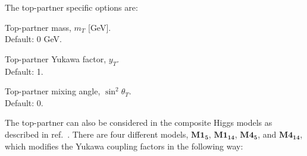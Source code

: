 \documentclass[12pt,a4wide]{article}
\begin{document}
The top-partner specific options are: 
\begin{description}[labelindent=\parindent, labelwidth =\widthof{\bfseries9999999999999999999999}, leftmargin = !] 
	\item[\texttt{--mtp <value>}] Top-partner mass, $m_{T}$ [GeV]. \\ Default: 0 GeV. 
	\item[\texttt{--ytp <value>}] Top-partner Yukawa factor, $y_T$. \\ Default: 1. 
	\item[\texttt{--sth2 <value>}] Top-partner mixing angle, $\sin^2 \theta_T$. \\ Default: 0. 
\end{description} 
The top-partner can also be considered in the composite Higgs models as described in ref.~\cite{Banfi:2019xai}. There are four different models, $\textbf{M1}_{\textbf{5}}$, $\textbf{M1}_{\textbf{14}}$, $\textbf{M4}_{\textbf{5}}$, and $\textbf{M4}_{\textbf{14}}$, which modifies the Yukawa coupling factors in the following way: 
\end{document}

